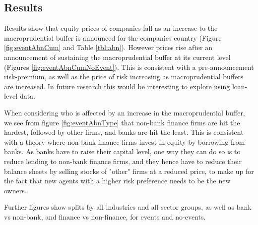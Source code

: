 \documentclass[11pt]{article}
\newcommand\fnote[1]{\captionsetup{font=small}\caption*{#1}}
\begin{document}


\subsection{Results}

Results show that equity prices of companies fall as an increase to the macroprudential buffer is announced for the companies country (Figure \ref{fig:eventAbnCum} and Table \ref{tbl:abn}). However prices rise after an announcement of sustaining the macroprudential buffer at its current level (Figures \ref{fig:eventAbnCumNoEvent}). This is consistent with a pre-announcement risk-premium, as well as the price of risk increasing as macroprudential buffers are increased. In future research this would be interesting to explore using loan-level data.

When considering who is affected by an increase in the macroprudential buffer, we see from figure \ref{fig:eventAbnType} that non-bank finance firms are hit the hardest, followed by other firms, and banks are hit the least. This is consistent with a theory where non-bank finance firms invest in equity by borrowing from banks. As banks have to raise their capital level, one way they can do so is to reduce lending to non-bank finance firms, and they hence have to reduce their balance sheets by selling stocks of "other" firms at a reduced price, to make up for the fact that new agents with a higher risk preference needs to be the new owners. 

Further figures show splits by all industries and all sector groups, as well as bank vs non-bank, and finance vs non-finance, for events and no-events.


\iffalse
\subsection{Robustness Checks}

Robust to computing CAR using cumulative product instead of cumulative sums, as the results look almost identical, as can be seen from figure \ref{fig:eventAbnCump}.



\begin{figure}%
	\centering
	\includegraphics%
	{./figures/retabncum.pdf}
	\caption{Cumulative Abnormal Returns - Event}
	\label{fig:eventAbnCump}
	\fnote{Cumulated using products. Event means an increase in the macroprudential buffer of 0.5 percentage point or higher. Blue line and grey area denotes fit and 90\% confidence bands using the Loess method. Triangles signify daily means.}
\end{figure}
\fi
\end{document}
